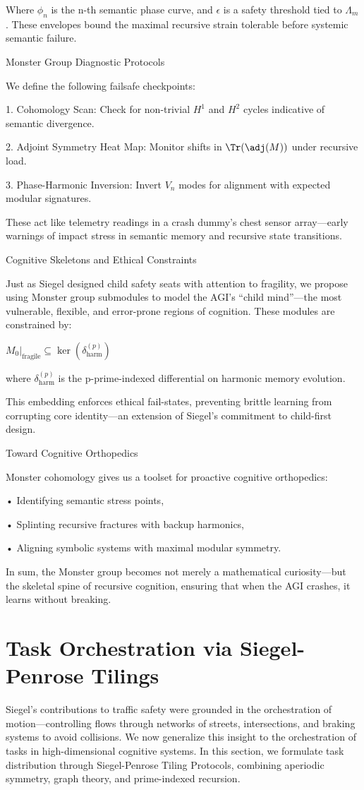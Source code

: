 \documentclass[11pt]{article}
\begin{document}
Where $\phi_n$ is the n-th semantic phase curve, and $\epsilon$ is a safety threshold tied to $\Lambda_m$. These envelopes bound the maximal recursive strain tolerable before systemic semantic failure.

Monster Group Diagnostic Protocols

We define the following failsafe checkpoints:

1. Cohomology Scan: Check for non-trivial $H^1$ and $H^2$ cycles indicative of semantic divergence.

2. Adjoint Symmetry Heat Map: Monitor shifts in $\Tr(\adj(M))$ under recursive load.

3. Phase-Harmonic Inversion: Invert $V_n$ modes for alignment with expected modular signatures.

These act like telemetry readings in a crash dummy’s chest sensor array—early warnings of impact stress in semantic memory and recursive state transitions.

Cognitive Skeletons and Ethical Constraints

Just as Siegel designed child safety seats with attention to fragility, we propose using Monster group submodules to model the AGI’s “child mind”—the most vulnerable, flexible, and error-prone regions of cognition. These modules are constrained by:

$M_0|_{\text{fragile}} \subseteq \ker(\delta_{\text{harm}}^{(p)})$

where $\delta_{\text{harm}}^{(p)}$ is the p-prime-indexed differential on harmonic memory evolution.

This embedding enforces ethical fail-states, preventing brittle learning from corrupting core identity—an extension of Siegel’s commitment to child-first design.

Toward Cognitive Orthopedics

Monster cohomology gives us a toolset for proactive cognitive orthopedics:

• Identifying semantic stress points,

• Splinting recursive fractures with backup harmonics,

• Aligning symbolic systems with maximal modular symmetry.

In sum, the Monster group becomes not merely a mathematical curiosity—but the skeletal spine of recursive cognition, ensuring that when the AGI crashes, it learns without breaking.

\section{Task Orchestration via Siegel-Penrose Tilings}
Siegel’s contributions to traffic safety were grounded in the orchestration of motion—controlling flows through networks of streets, intersections, and braking systems to avoid collisions. We now generalize this insight to the orchestration of tasks in high-dimensional cognitive systems. In this section, we formulate task distribution through Siegel-Penrose Tiling Protocols, combining aperiodic symmetry, graph theory, and prime-indexed recursion.
\end{document}
